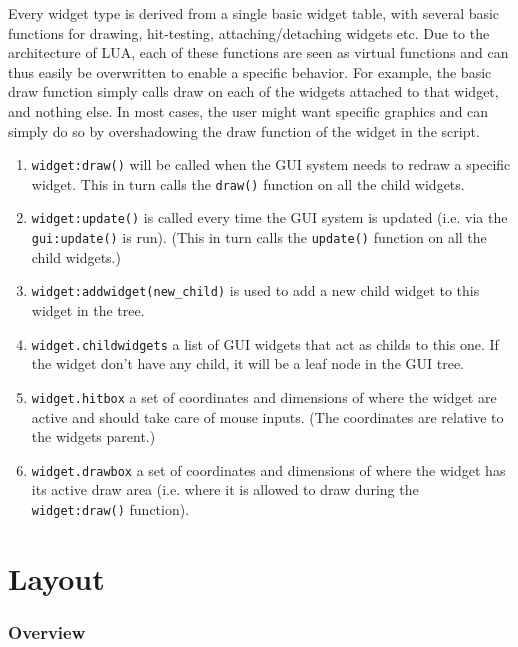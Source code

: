 Every widget type is derived from a single basic widget table, with several basic functions for drawing, hit-testing, attaching/detaching widgets etc. Due to the architecture of LUA, each of these functions are seen as virtual functions and can thus easily be overwritten to enable a specific behavior. For example, the basic draw function simply calls draw on each of the widgets attached to that widget, and nothing else. In most cases, the user might want specific graphics and can simply do so by overshadowing the draw function of the widget in the script. 

\begin{enumerate}
  \item \texttt{widget:draw()} will be called when the GUI system needs to redraw a specific widget. This in turn calls the \texttt{draw()} function on all the child widgets.
  \item \texttt{widget:update()} is called every time the GUI system is updated (i.e. via the \texttt{gui:update()} is run). (This in turn calls the \texttt{update()} function on all the child widgets.)
  \item \texttt{widget:addwidget(new\_child)} is used to add a new child widget to this widget in the tree.
  \item \texttt{widget.childwidgets} a list of GUI widgets that act as childs to this one. If the widget don't have any child, it will be a leaf node in the GUI tree.
  \item \texttt{widget.hitbox} a set of coordinates and dimensions of where the widget are active and should take care of mouse inputs. (The coordinates are relative to the widgets parent.)
  \item \texttt{widget.drawbox} a set of coordinates and dimensions of where the widget has its active draw area (i.e. where it is allowed to draw during the \texttt{widget:draw()} function).
\end{enumerate}

\section{Layout}

\subsubsection{Overview}


